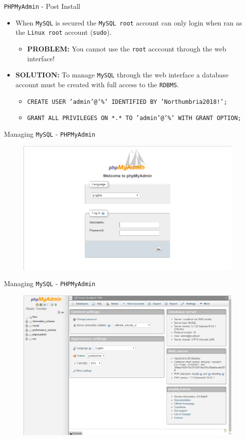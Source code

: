 \documentclass[xcolor=table,aspectratio=169]{beamer}
\begin{document}
\begin{frame}{\texttt{PHPMyAdmin} - Post Install}
  \begin{itemize}
    \item When \texttt{MySQL} is secured the \texttt{MySQL root} account can only login when ran as the \texttt{Linux root} account (\texttt{sudo}).
      \begin{itemize}
        \item \textbf{PROBLEM:} You cannot use the \texttt{root} acccount through the web interface!
      \end{itemize}
    \item \textbf{SOLUTION:} To manage \texttt{MySQL} through the web interface a database account must be created with full access to the \texttt{RDBMS}.
      \begin{itemize}
        \item \texttt{CREATE USER 'admin'@'\%' IDENTIFIED BY 'Northumbria2018!';}
        \item \texttt{GRANT ALL PRIVILEGES ON *.* TO 'admin'@'\%' WITH GRANT OPTION;}
      \end{itemize}
  \end{itemize}
\end{frame}

\begin{frame}{Managing \texttt{MySQL} - \texttt{PHPMyAdmin}}
  \begin{figure}
    \begin{center}
      \includegraphics[width=0.6\linewidth]{PHPLogin.png}
    \end{center}
  \end{figure}
\end{frame}

\begin{frame}{Managing \texttt{MySQL} - \texttt{PHPMyAdmin}}
  \begin{figure}
    \begin{center}
      \includegraphics[width=0.6\linewidth]{PHPMyAdmin.png}
    \end{center}
  \end{figure}
\end{frame}
\end{document}
